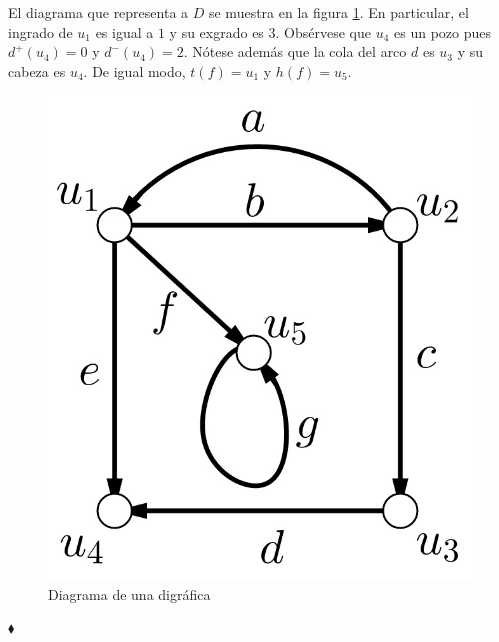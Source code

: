 \begin{ejem}
El diagrama que representa a $D$ se muestra en la figura \ref{fig:digraficadiagrama}. En particular, el ingrado de $u_{1}$ es igual a $1$ y su exgrado es $3$. Obsérvese que $u_{4}$ es un pozo pues $d^{+}(u_{4})=0$ y $d^{-}(u_{4})=2$. Nótese además que la cola del arco $d$ es $u_{3}$ y su cabeza es $u_{4}$. De igual modo, $t(f) = u_{1}$ y $h(f)=u_{5}$.
\begin{figure}
    \centering
    \includegraphics[scale=0.3]{img/imgchapter1/digrafica.jpg}
    \caption{Diagrama de una digráfica}
    \label{fig:digraficadiagrama}
\end{figure}

\hfill $\blacklozenge$
 \end{ejem}
 
 
